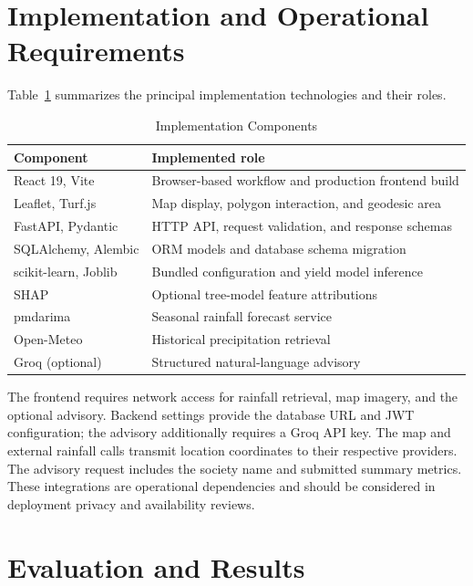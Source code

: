 \documentclass[conference]{IEEEtran}
\begin{document}
\section{Implementation and Operational Requirements}
\label{sec:implementation}

Table~\ref{tab:stack} summarizes the principal implementation
technologies and their roles.

\begin{table}[htbp]
\caption{Implementation Components}
\label{tab:stack}
\centering
\small
\begin{tabular}{p{}p{}}
\toprule
\textbf{Component} & \textbf{Implemented role}\\
\midrule
React 19, Vite & Browser-based workflow and production frontend build\\
Leaflet, Turf.js & Map display, polygon interaction, and geodesic area\\
FastAPI, Pydantic & HTTP API, request validation, and response schemas\\
SQLAlchemy, Alembic & ORM models and database schema migration\\
scikit-learn, Joblib & Bundled configuration and yield model inference\\
SHAP & Optional tree-model feature attributions\\
pmdarima & Seasonal rainfall forecast service\\
Open-Meteo & Historical precipitation retrieval\\
Groq (optional) & Structured natural-language advisory\\
\bottomrule
\end{tabular}
\end{table}

The frontend requires network access for rainfall retrieval, map imagery,
and the optional advisory. Backend settings provide the database URL and
JWT configuration; the advisory additionally requires a Groq API key.
The map and external rainfall calls transmit location coordinates to
their respective providers. The advisory request includes the society
name and submitted summary metrics. These integrations are operational
dependencies and should be considered in deployment privacy and
availability reviews.

\section{Evaluation and Results}
\label{sec:evaluation}
\end{document}
